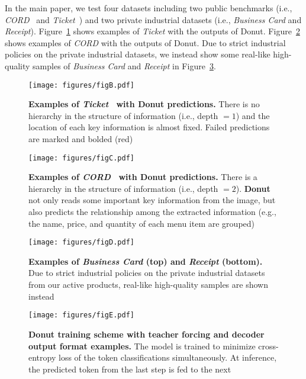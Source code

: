 \documentclass[runningheads]{llncs}
\newcommand\ours{{{\mbox{Donut}}}\xspace}
\newcommand\oursb{{\textbf{\mbox{Donut}}}\xspace}
\begin{document}
In the main paper, we test four datasets including two public benchmarks (i.e., \textit{CORD}~\cite{park2019cord} and \textit{Ticket}~\cite{eaten}) and two private industrial datasets (i.e., \textit{Business Card} and \textit{Receipt}). 
Figure~\ref{fig:ticket_example} shows examples of \textit{Ticket} with the outputs of Donut.
Figure~\ref{fig:cord_example} shows examples of \textit{CORD} with the outputs of Donut.
Due to strict industrial policies on the private industrial datasets, we instead show some real-like high-quality samples of \textit{Business Card} and \textit{Receipt} in Figure~\ref{fig:kor_jpn_example}.

\begin{figure}[t!]
    \centering
    \texttt{[image: figures/figB.pdf]}
    \caption{{\bf Examples of \textit{Ticket}~\cite{eaten} with \ours predictions.} There is no hierarchy in the structure of information (i.e., depth $=1$) and the location of each key information is almost fixed. Failed predictions are marked and bolded (red)}
    \label{fig:ticket_example}
\end{figure}

\begin{figure}[t!]
    \centering
    \texttt{[image: figures/figC.pdf]}
    \caption{{\bf Examples of \textit{CORD}~\cite{park2019cord} with \ours predictions.} There is a hierarchy in the structure of information (i.e., depth $=2$). \oursb not only reads some important key information from the image, but also predicts the relationship among the extracted information (e.g., the name, price, and quantity of each menu item are grouped)}
    \label{fig:cord_example}
\end{figure}

\begin{figure}[t!]
    \centering
    \texttt{[image: figures/figD.pdf]}
    \caption{{\bf Examples of \textit{Business Card} (top) and \textit{Receipt} (bottom).} Due to strict industrial policies on the private industrial datasets from our active products, real-like high-quality samples are shown instead}
    \label{fig:kor_jpn_example}
\end{figure}

\begin{figure}[t]
  \centering
  \texttt{[image: figures/figE.pdf]}
  \vspace{-6.8995mm}
  \caption{\textbf{Donut training scheme with teacher forcing and decoder output format examples.} The model is trained to minimize cross-entropy loss of the token classifications simultaneously. At inference, the predicted token from the last step is fed to the next} \label{fig:onecol}
\end{figure}
\end{document}
